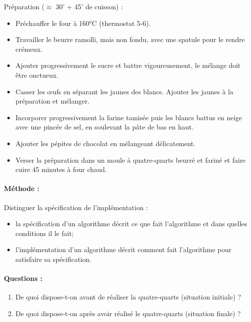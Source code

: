 \noindent
Préparation ($\approx$ 30' + 45' de cuisson) :
\begin{itemize}
\item Préchauffer le four à 160°C (thermostat 5-6).
\item Travailler le beurre ramolli, mais non fondu, avec une spatule pour le rendre crémeux.
\item Ajouter progressivement le sucre et battre vigoureusement, le mélange doit être onctueux.
\item Casser les \oe ufs en séparant les jaunes des blancs. 
	Ajouter les jaunes à la préparation et mélanger.
\item Incorporer progressivement la farine tamisée puis les blancs battus en neige 
	avec une pincée de sel, en soulevant la pâte de bas en haut.
\item Ajouter les pépites de chocolat en mélangeant délicatement. 
\item Verser la préparation dans un moule à quatre-quarts beurré et fariné et 
	faire cuire 45 minutes à four chaud.
\end{itemize}

\paragraph{Méthode :} Distinguer la spécification de l'implémentation :
\begin{itemize}
\item la spécification d'un algorithme décrit ce que fait l'algorithme 
et dans quelles conditions il le fait;
\item l'implémentation d'un algorithme décrit comment fait l'algorithme 
pour satisfaire sa spécification.
\end{itemize}

\paragraph{Questions :} \mbox{}

\begin{question}\mbox{}
\begin{enumerate}
\item De quoi dispose-t-on avant de réaliser la quatre-quarts (situation initiale) ?
\item De quoi dispose-t-on après avoir réalisé le quatre-quarts (situation finale) ?
\end{enumerate}

\end{question}

